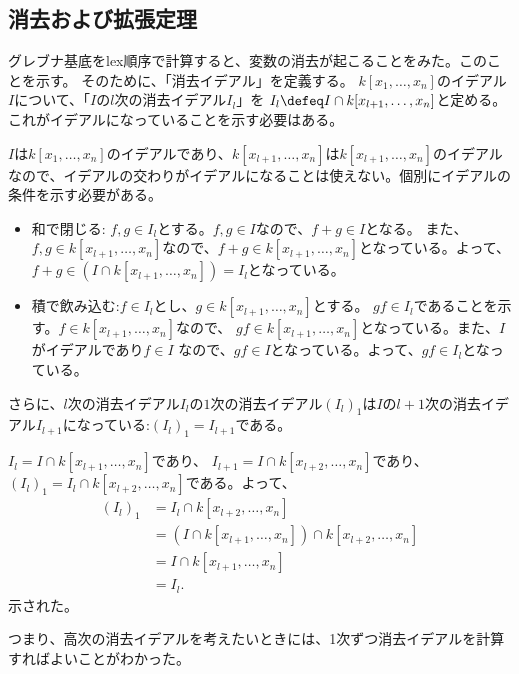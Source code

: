\label{sec:消去理論}
\subsection{消去および拡張定理}
\label{sub:消去および拡張定理}
グレブナ基底をlex順序で計算すると、変数の消去が起こることをみた。このことを示す。
そのために、「消去イデアル」を定義する。
$k[x_1,\dots,x_n]$のイデアル$I$について、「$I$の$l$次の消去イデアル$I_l$」を
$I_l \defeq I \cap k[x_{l+1},\dots,x_n]$と定める。これがイデアルになっていることを示す必要はある。
\begin{myproof}
  $I$は$k[x_1,\dots,x_n]$のイデアルであり、$k[x_{l+1},\dots,x_n]$は$k[x_{l+1},\dots,x_n]$のイデアルなので、イデアルの交わりがイデアルになることは使えない。個別にイデアルの条件を示す必要がある。
  \begin{itemize}
    \item 和で閉じる:
    $f, g\in I_l$とする。$f,g \in I$なので、$f+g \in I$となる。
    また、$f,g \in k[x_{l+1},\dots,x_n]$なので、$f+g \in k[x_{l+1},\dots,x_n]$となっている。よって、$f+g \in (I\cap k[x_{l+1},\dots,x_n]) = I_l$となっている。
    \item 積で飲み込む:$f \in I_l$とし、$g\in k[x_{l+1},\dots,x_n]$とする。
    $gf \in I_l$であることを示す。$f\in k[x_{l+1},\dots,x_n]$なので、
    $gf \in k[x_{l+1},\dots,x_n]$となっている。また、$I$がイデアルであり$f\in I$
    なので、$gf\in I$となっている。よって、$gf\in I_l$となっている。
  \end{itemize}
\end{myproof}
さらに、$l$次の消去イデアル$I_{l}$の$1$次の消去イデアル$(I_l)_1$は$I$の$l+1$次の消去イデアル$I_{l+1}$になっている:$(I_l)_1 = I_{l+1}$である。
\begin{myproof}
  $I_l = I \cap k[x_{l+1},\dots,x_n]$であり、
  $I_{l+1} = I\cap k[x_{l+2},\dots,x_n]$であり、
  $(I_l)_1 = I_l \cap k[x_{l+2},\dots,x_n]$である。よって、
  \begin{align}
    (I_l)_1
    &=
    I_l \cap k[x_{l+2},\dots,x_n]\\
    &=
    (I\cap k[x_{l+1},\dots,x_n]) \cap k[x_{l+2},\dots,x_n]\\
    &=
    I \cap k[x_{l+1},\dots,x_n]\\
    &=
    I_l.
  \end{align}
  示された。
\end{myproof}
つまり、高次の消去イデアルを考えたいときには、1次ずつ消去イデアルを計算すればよいことがわかった。

